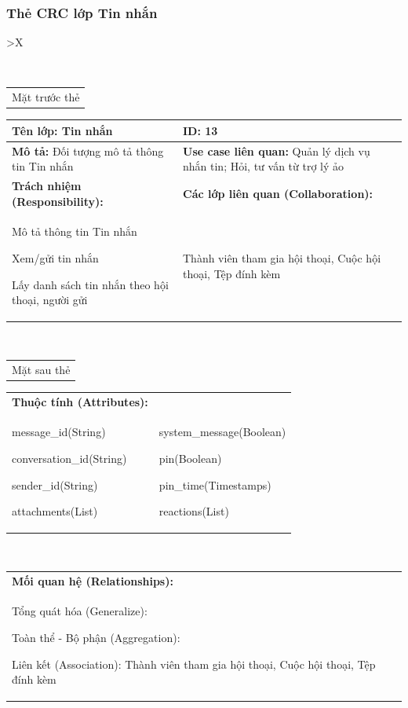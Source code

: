\subsubsection{Thẻ CRC lớp Tin nhắn}
  \begin{xltabular}{\textwidth}{
    >{\centering\arraybackslash}X 
  }
  \caption{\bfseries \fontsize{12pt}{0pt}\selectfont Thẻ CRC lớp Tin nhắn}
  \\
  \begin{tabularx}{0.9\textwidth}{X}
    Mặt trước thẻ
  \end{tabularx}
  \begin{tabularx}{0.9\textwidth}{|X|X|}
    \hline
    \textbf{Tên lớp:} Tin nhắn & \textbf{ID:} 13 \\
    \hline
    \textbf{Mô tả:} Đối tượng mô tả thông tin Tin nhắn & \textbf{Use case liên quan:} Quản lý dịch vụ nhắn tin; Hỏi, tư vấn từ trợ lý ảo \\
    \hline
    \textbf{Trách nhiệm (Responsibility):} & \textbf{Các lớp liên quan (Collaboration):} \\
    Mô tả thông tin Tin nhắn

    Xem/gửi tin nhắn

    Lấy danh sách tin nhắn theo hội thoại, người gửi
    & 
    Thành viên tham gia hội thoại, Cuộc hội thoại, Tệp đính kèm
    \\
    \hline
  \end{tabularx}
  \\ 
  \begin{tabularx}{0.9\textwidth}{X}
    Mặt sau thẻ
  \end{tabularx} 
  \begin{tabularx}{0.9\textwidth}{|X|X|}
    \hline
    \textbf{Thuộc tính (Attributes):} & \\
    message\_id(String) 
    
    conversation\_id(String)

    sender\_id(String)

    attachments(List)
    &
    system\_message(Boolean)

    pin(Boolean)

    pin\_time(Timestamps)

    reactions(List)
    \\
    \hline
  \end{tabularx}
  \\     
  \begin{tabularx}{0.9\textwidth}{|X|}
    \textbf{Mối quan hệ (Relationships):} \\
    Tổng quát hóa (Generalize):  

    Toàn thể - Bộ phận (Aggregation): 
    
    Liên kết (Association): Thành viên tham gia hội thoại, Cuộc hội thoại, Tệp đính kèm 
    \\
    \hline
  \end{tabularx}
  \end{xltabular}

